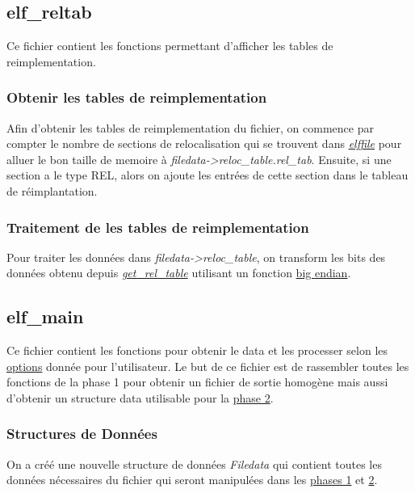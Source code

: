 \documentclass[a4paper]{article} %
\begin{document}

\subsection{elf\_reltab}
\label{sec:relocation}
\noindent Ce fichier contient les fonctions permettant d'afficher les tables de 
reimplementation.

\subsubsection*{Obtenir les tables de reimplementation}
\label{sec:getreltab}
Afin d'obtenir les tables de reimplementation du fichier, on commence par compter 
le nombre de sections de relocalisation qui se trouvent dans \hyperref[sec:elffile]{\textit{elffile}} pour alluer 
le bon taille de memoire à \textit{filedata->reloc\_table.rel\_tab}. Ensuite, si une 
section a le type REL, alors on ajoute les entrées de cette section dans le tableau de 
réimplantation.

\subsubsection*{Traitement de les tables de reimplementation}
Pour traiter les données dans \textit{filedata->reloc\_table}, on transform 
les bits des données obtenu depuis \hyperref[sec:getreltab]{\textit{get\_rel\_table}}
utilisant un fonction \hyperref[sec:endian]{big endian}. 


\subsection{elf\_main}
\noindent Ce fichier contient les fonctions pour obtenir le data et les processer 
selon les \hyperref[sec:options]{options} donnée pour l'utilisateur. Le but de ce 
fichier est de rassembler toutes les fonctions de la phase 1 pour obtenir un fichier 
de sortie homogène mais aussi d'obtenir un structure data utilisable pour la 
\hyperref[sec:phase2]{phase 2}.

\subsubsection*{Structures de Données}
\label{sec:filedata}

On a créé une nouvelle structure de données \textit{Filedata} qui contient 
toutes les données nécessaires du fichier qui seront manipulées dans les \hyperref[sec:phase1]{phases 1} 
et \hyperref[sec:phase2]{2}. 
\end{document}
